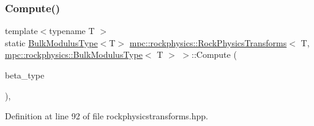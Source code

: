 \subsubsection{\texorpdfstring{Compute()}{Compute()}\hspace{0.1cm}{\footnotesize\ttfamily [7/8]}}
{\footnotesize\ttfamily template$<$typename T $>$ \\
static \mbox{\hyperlink{structmpc_1_1rockphysics_1_1_bulk_modulus_type}{Bulk\+Modulus\+Type}}$<$T$>$ \mbox{\hyperlink{structmpc_1_1rockphysics_1_1_rock_physics_transforms}{mpc\+::rockphysics\+::\+Rock\+Physics\+Transforms}}$<$ T, \mbox{\hyperlink{structmpc_1_1rockphysics_1_1_bulk_modulus_type}{mpc\+::rockphysics\+::\+Bulk\+Modulus\+Type}}$<$ T $>$ $>$\+::Compute (\begin{DoxyParamCaption}\item[{const \mbox{\hyperlink{structmpc_1_1rockphysics_1_1_compressibility_modulus_type}{mpc\+::rockphysics\+::\+Compressibility\+Modulus\+Type}}$<$ T $>$ \&}]{beta\+\_\+type }\end{DoxyParamCaption})\hspace{0.3cm}{\ttfamily [inline]}, {\ttfamily [static]}}



Definition at line 92 of file rockphysicstransforms.\+hpp.

\mbox{\label{structmpc_1_1rockphysics_1_1_rock_physics_transforms_3_01_t_00_01mpc_1_1rockphysics_1_1_bulk_modulus_type_3_01_t_01_4_01_4_a97d6e68c3ad8449a3c7f07e9d760161a}} 
